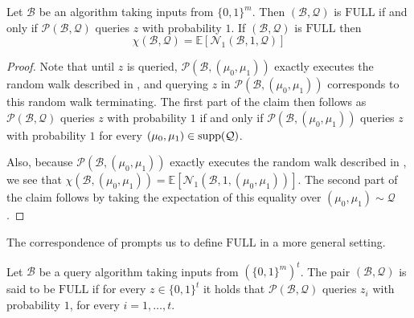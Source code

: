 \documentclass{toc}
\newcommand{\full}{\text{FULL}}
\newcommand\supp{\mathop{\rm supp}}
\newcommand{\clB}{\mathcal{B}}
\newcommand{\clQ}{\mathcal{Q}}
\newcommand{\clP}{\mathcal{P}}
\newcommand{\clN}{\mathcal{N}}
\newcommand{\E}{\mathbb{E}}
\begin{document}
\begin{claim}
\label{clm:full}
Let $\clB$ be an algorithm taking inputs from $\{0,1\}^m$.  Then
$(\clB, \clQ)$ is $\full$ if and only if $\clP(\clB, \clQ)$ queries $z$ with probability $1$.  If $(\clB, \clQ)$ is $\full$ then 
\[
\chi(\clB, \clQ) = \E[\clN_1(\clB,1, \clQ)]
\]
\end{claim}

\begin{proof}
Note that until $z$ is queried, $\clP(\clB, (\mu_0,\mu_1))$ exactly executes the random walk described in , and querying $z$ in 
$\clP(\clB, (\mu_0,\mu_1))$ corresponds to this random walk terminating.  The first part of the claim then follows as $\clP(\clB, \clQ)$ queries $z$ with probability $1$ 
if and only if $\clP(\clB, (\mu_0, \mu_1))$ queries $z$ with probability $1$ for every $(\mu_0, \mu_1) \in \supp(\clQ)$. 

Also, because $\clP(\clB, (\mu_0,\mu_1))$ exactly executes the random walk described in , we see that 
$\chi(\clB, (\mu_0, \mu_1)) = \E[\clN_1(\clB,1, (\mu_0, \mu_1))]$.  The second part of the claim follows by taking the expectation of this 
equality over $(\mu_0, \mu_1) \sim \clQ$.
\end{proof}

The correspondence of  prompts us to define $\full$ in a more general setting.
\begin{definition}[$\full$]
Let $\clB$ be a query algorithm taking inputs from $(\{0,1\}^m)^t$.
The pair $(\clB, \clQ)$ is said to be $\full$ if for every $z \in \{0,1\}^t$ it holds that $\clP (\clB, \clQ)$ queries $z_i$ with probability $1$, for every $i=1, \ldots, t$.
\end{definition}
\end{document}
